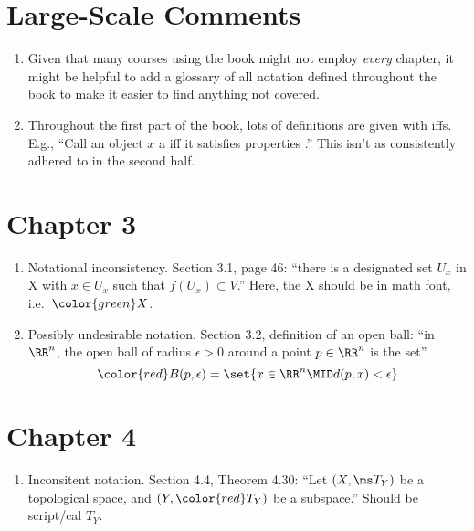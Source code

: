 \documentclass{fkletter}
\begin{document}
\section*{Large-Scale Comments}
\begin{enumerate}
  \item Given that many courses using the book might not employ \emph{every}
    chapter, it might be helpful to add a glossary of all notation defined
    throughout the book to make it easier to find anything not covered.
  \item Throughout the first part of the book, lots of definitions are given
    with iffs. E.g., ``Call an object $x$ a \underline{\phantom{thingy}} iff it
    satisfies properties \underline{\phantom{llist of properties}}.'' This isn't
    as consistently adhered to in the second half.
\end{enumerate}
\section*{Chapter 3}
\begin{enumerate}
  \item Notational inconsistency. Section 3.1, page 46: ``there is a designated
    set $U_x$ in {\color{red} X} with $x \in U_x$ such that $f(U_x) \subset
    V$.'' Here, the {\color{red} X} should be in math font, i.e.\
    ${\color{green} X}$.
  \item Possibly undesirable notation. Section 3.2, definition of an open ball:
    ``in $\RR^n$, the open ball of radius $\epsilon > 0$ around a point $p \in
    \RR^n$ is the set''
    \[
      {\color{red}B(p,\epsilon)} = \set{x \in \RR^n \MID d(p,x) < \epsilon}
    \]
\end{enumerate}
\section*{Chapter 4}
\begin{enumerate}
  \item Inconsitent notation. Section 4.4, Theorem 4.30: ``Let $(X,\ms T_Y)$ be
    a topological space, and $(Y, {\color{red} T_Y})$ be a subspace.'' Should be
    script/cal $T_Y$.
\end{enumerate}
\end{document}
